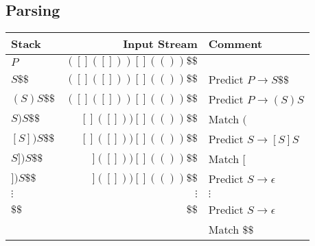 \documentclass{article}
\begin{document}
\subsection*{Parsing}

\begin{tabular}{l|r|l}
Stack & Input Stream & Comment \\
\hline
$P$ & $([]([]))[](())\$\$$ & \\
$S\$\$$ & $([]([]))[](())\$\$$ & Predict $P\rightarrow{}S\$\$$ \\
$(S)S\$\$$ & $([]([]))[](())\$\$$ & Predict $P\rightarrow{}(S)S$ \\
$S)S\$\$$ & $[]([]))[](())\$\$$ & Match $($ \\
$[S])S\$\$$ & $[]([]))[](())\$\$$ & Predict $S\rightarrow[S]S$ \\
$S])S\$\$$ & $]([]))[](())\$\$$ & Match $[$ \\
$])S\$\$$ & $]([]))[](())\$\$$ & Predict $S\rightarrow\epsilon$ \\
$\vdots$ & $\vdots$ & $\vdots$ \\
$\$\$$ & $\$\$$ & Predict $S\rightarrow\epsilon$ \\
& & Match $\$\$$ \\
\end{tabular}
\end{document}
